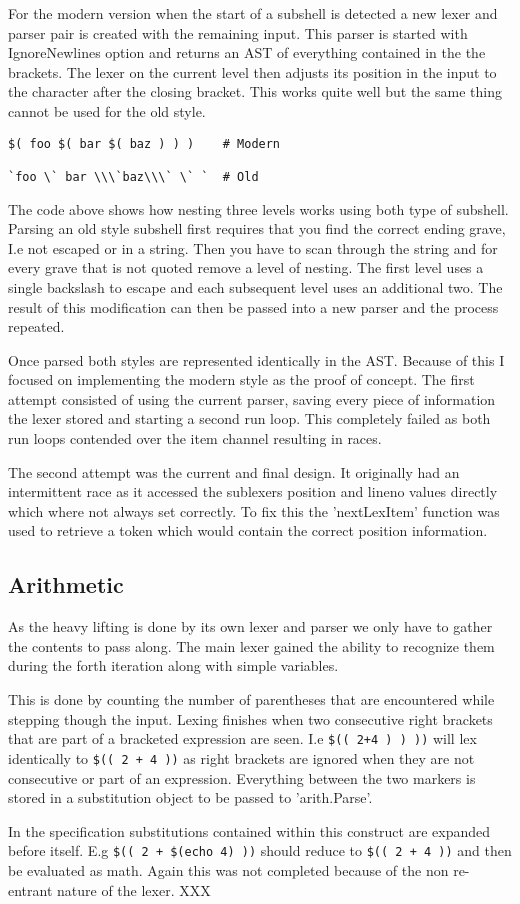 For the modern version when the start of a subshell is detected a new lexer and parser pair is created with the remaining input.
This parser is started with IgnoreNewlines option and returns an AST of everything contained in the the brackets.
The lexer on the current level then adjusts its position in the input to the character after the closing bracket.
This works quite well but the same thing cannot be used for the old style.

\begin{verbatim}
$( foo $( bar $( baz ) ) )    # Modern

`foo \` bar \\\`baz\\\` \` `  # Old
\end{verbatim}
The code above shows how nesting three levels works using both type of subshell.
Parsing an old style subshell first requires that you find the correct ending grave, I.e not escaped or in a string.
Then you have to scan through the string and for every grave that is not quoted remove a level of nesting.
The first level uses a single backslash to escape and each subsequent level uses an additional two.
The result of this modification can then be passed into a new parser and the process repeated.

Once parsed both styles are represented identically in the AST.
Because of this I focused on implementing the modern style as the proof of concept.
The first attempt consisted of using the current parser, saving every piece of information the lexer stored and starting a second run loop.
This completely failed as both run loops contended over the item channel resulting in races.

The second attempt was the current and final design.
It originally had an intermittent race as it accessed the sublexers position and lineno values directly which where not always set correctly.
To fix this the 'nextLexItem' function was used to retrieve a token which would contain the correct position information.

\subsection{Arithmetic} \label{sec:main-lexer-arith}
As the heavy lifting is done by its own lexer and parser we only have to gather the contents to pass along.
The main lexer gained the ability to recognize them during the forth iteration along with simple variables.

This is done by counting the number of parentheses that are encountered while stepping though the input.
Lexing finishes when two consecutive right brackets that are part of a bracketed expression are seen.
I.e \verb!$(( 2+4 ) ) ))! will lex identically to \verb!$(( 2 + 4 ))! as right brackets are ignored when they are not consecutive or part of an expression.
Everything between the two markers is stored in a substitution object to be passed to 'arith.Parse'.

In the specification substitutions contained within this construct are expanded before itself.
E.g \verb!$(( 2 + $(echo 4) ))! should reduce to \verb!$(( 2 + 4 ))! and then be evaluated as math.
Again this was not completed because of the non re-entrant nature of the lexer. XXX












